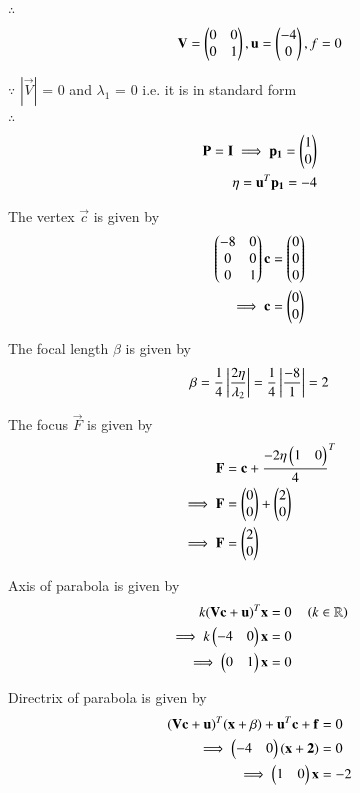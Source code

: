 \documentclass[journal,12pt,twocolumn]{IEEEtran}
\begin{document}
$\therefore$
\begin{align}
 \mathbf{V} = \begin{pmatrix}0 & 0 \\ 0 & 1\end{pmatrix} ,
 \mathbf{u} = \begin{pmatrix}-4\\0\end{pmatrix} ,
 f = 0
\end{align}

$\because$
$|\vec{V}|$ = 0 and $\lambda_1$ = 0 i.e. it is in standard form
\\
$\therefore$
\begin{align}
\mathbf{P}=\mathbf{I} \implies \mathbf{p_1} = \begin{pmatrix}1\\0\end{pmatrix}
\\
\eta = \mathbf{u}^T\mathbf{p_1} = -4
\end{align}

The vertex $\vec{c}$ is given by
\begin{align}
\begin{pmatrix}-8 & 0\\0 & 0\\0 & 1\end{pmatrix}\mathbf{c} &= \begin{pmatrix}0\\0\\0\end{pmatrix}
\\
\implies \mathbf{c} &= \begin{pmatrix}0\\0\end{pmatrix}
\end{align}

The focal length $\beta$ is given by
\begin{align}
\beta = \frac{1}{4}\left\vert\frac{2\eta}{\lambda_2}\right\vert = \frac{1}{4}\left\vert\frac{-8}{1}\right\vert= 2
\end{align}

The focus $\vec{F}$ is given by
\begin{align}
\mathbf{F} &= \mathbf{c} + {\frac{-2\eta\begin{pmatrix}1 & 0\end{pmatrix}}{4}}^{T} 
\\
\implies \mathbf{F} &= \begin{pmatrix}0\\0\end{pmatrix} + \begin{pmatrix}2\\0\end{pmatrix}
\\
\implies \mathbf{F} &= \begin{pmatrix}2\\0\end{pmatrix}
\end{align}

Axis of parabola is given by
\begin{align}
k(\mathbf{V}\mathbf{c}+\mathbf{u})^{T}\mathbf{x} &= 0 \quad\left(  k \in \mathbb{R}\right)
\\
\implies k\begin{pmatrix}-4 & 0\end{pmatrix}\mathbf{x} &= 0
\\
\implies \begin{pmatrix}0 & 1\end{pmatrix}\mathbf{x} &= 0
\end{align}

Directrix of parabola is given by
\begin{align}
(\mathbf{V}\mathbf{c}+\mathbf{u})^T(\mathbf{x} +\beta) + \mathbf{u}^T\mathbf{c} + \mathbf{f} &= 0
\\
\implies \begin{pmatrix}-4 & 0\end{pmatrix}(\mathbf{x+2}) &= 0
\\
\implies \begin{pmatrix}1 & 0\end{pmatrix}\mathbf{x} &= -2
\end{align}
\end{document}
